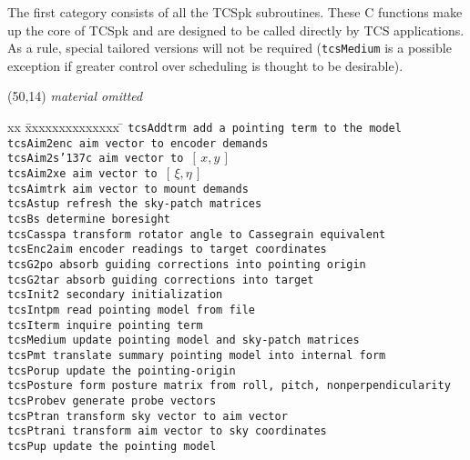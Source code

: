 \documentclass[12pt,fleqn,twoside]{article}
\renewcommand{\_}{{\tt\char'137}}     %
\newcommand{\xieta}     {$[\,\xi,\eta\,]$}
\newcommand{\xy}        {$[\,x,y\,]$}
\newcommand{\abridged}  {\vspace{3ex} \begin{center}
                        \framebox(50,14){\vspace*{1mm}
                        \large \it material omitted}
                        \end{center}\vspace{3ex}}
\begin{document}
The first category consists of all the TCSpk subroutines.  These C
functions make up the core of TCSpk and are designed
to be called directly by TCS applications.  As a
rule, special tailored versions will not be required ({\tt tcsMedium} is a
possible exception if greater control over scheduling is thought to
be desirable).
\ifx\vdoc\vshort
\abridged
\else
\begin{tabbing}
xx \= xxxxxxxxxxxxxx \= \kill
\> \tt tcsAddtrm   \> add a pointing term to the model \\
\> \tt tcsAim2enc  \> aim vector to encoder demands \\
\> \tt tcsAim2s\_c \> aim vector to \xy \\
\> \tt tcsAim2xe   \> aim vector to \xieta \\
\> \tt tcsAimtrk   \> aim vector to mount demands \\
\> \tt tcsAstup    \> refresh the sky-patch matrices \\
\> \tt tcsBs       \> determine boresight \\
\> \tt tcsCasspa   \> transform rotator angle to Cassegrain equivalent \\
\> \tt tcsEnc2aim  \> encoder readings to target coordinates \\
\> \tt tcsG2po     \> absorb guiding corrections into pointing origin \\
\> \tt tcsG2tar    \> absorb guiding corrections into target \\
\> \tt tcsInit2    \> secondary initialization \\
\> \tt tcsIntpm    \> read pointing model from file \\
\> \tt tcsIterm    \> inquire pointing term \\
\> \tt tcsMedium   \> update pointing model and sky-patch matrices \\
\> \tt tcsPmt      \> translate summary pointing model into internal form \\
\> \tt tcsPorup    \> update the pointing-origin \\
\> \tt tcsPosture  \> form posture matrix from roll, pitch,
                                                      nonperpendicularity \\
\> \tt tcsProbev   \> generate probe vectors \\
\> \tt tcsPtran    \> transform sky vector to aim vector \\
\> \tt tcsPtrani   \> transform aim vector to sky coordinates\\
\> \tt tcsPup      \> update the pointing model \\

\end{tabbing}
\end{document}
